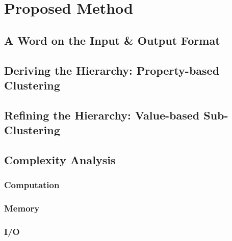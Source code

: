 \chapter{Proposed Method}






\section{A Word on the Input \& Output Format}

\section{Deriving the Hierarchy: Property-based Clustering}



\section{Refining the Hierarchy: Value-based Sub-Clustering}

\section{Complexity Analysis}
\subsection{Computation}
\subsection{Memory}
\subsection{I/O}

